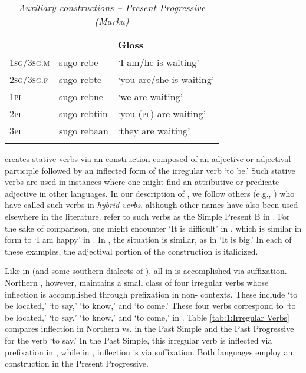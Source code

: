 \documentclass[output=paper]{LSP/langsci}
\begin{document}
 \begin{table}
 	\caption{\textit{Auxiliary constructions -- Present Progressive (Marka)}}
 	\label{tab:1:Auxiliary}
 	\begin{tabularx}{\textwidth}{Xll} 
 		\lsptoprule
 		& \ili{Marka}   & Gloss    \\
 		\midrule
 		1\textsc{sg}/3\textsc{sg.m} & sugo rebe & `I am/he is waiting' \\
 		2\textsc{sg}/3\textsc{sg.f} & sugo rebte  & `you are/she is waiting'  \\
 		1\textsc{pl} & sugo rebne & `we are waiting'  \\
 		2\textsc{pl} & sugo rebtiin & `you (\textsc{pl}) are waiting'  \\
 		3\textsc{pl} & sugo rebaan & `they are waiting'  \\
 		\lspbottomrule
 	\end{tabularx}
 \end{table}
 
  creates stative verbs via an  construction composed of an adjective or adjectival participle followed by an inflected form of the irregular verb  `to be.' Such stative verbs are used in instances where one might find an attributive or predicate adjective in other languages. In our description of , we follow others (e.g., \citealt{Andrzejewski1969,AjelloPuglielli1988}) who have called such verbs in  \textit{hybrid verbs}, although other names have also been used elsewhere in the literature. \citet{PasterRanero2015} refer to such verbs as the Simple Present B in . For the sake of comparison, one might encounter  `It is difficult' in , which is similar in form to  `I am happy' in . In , the situation is similar, as in  `It is big.' In each of these examples, the adjectival portion of the  construction is italicized.
 
 Like in  (and some southern dialects of ), all  in  is accomplished via suffixation. Northern , however, maintains a small class of four irregular verbs whose inflection is accomplished through prefixation in non- contexts. These include  `to be located,'  `to say,'  `to know,' and  `to come.' These four verbs correspond to  `to be located,'  `to say,'  `to know,' and  `to come,' in . Table \ref{tab:1:Irregular Verbs} compares inflection in Northern  vs.  in the Past Simple and the Past Progressive for the verb `to say.' In the Past Simple, this irregular verb is inflected via prefixation in , while in , inflection is via suffixation. Both languages employ an  construction in the Present Progressive.
 
\end{document}
